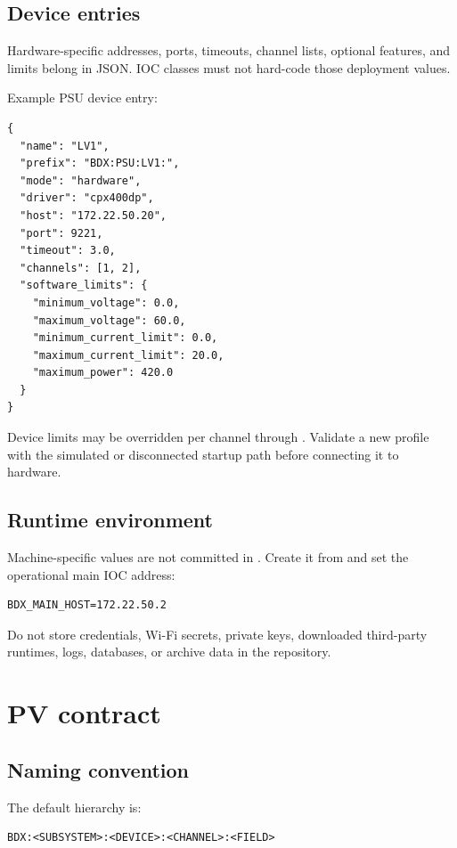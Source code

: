 \subsection{Device entries}

Hardware-specific addresses, ports, timeouts, channel lists, optional features, and limits belong in JSON. IOC classes must not hard-code those deployment values.

Example PSU device entry:

\begin{lstlisting}[style=json]
{
  "name": "LV1",
  "prefix": "BDX:PSU:LV1:",
  "mode": "hardware",
  "driver": "cpx400dp",
  "host": "172.22.50.20",
  "port": 9221,
  "timeout": 3.0,
  "channels": [1, 2],
  "software_limits": {
    "minimum_voltage": 0.0,
    "maximum_voltage": 60.0,
    "minimum_current_limit": 0.0,
    "maximum_current_limit": 20.0,
    "maximum_power": 420.0
  }
}
\end{lstlisting}

Device limits may be overridden per channel through . Validate a new profile with the simulated or disconnected startup path before connecting it to hardware.

\subsection{Runtime environment}

Machine-specific values are not committed in . Create it from  and set the operational main IOC address:

\begin{lstlisting}[style=shell]
BDX_MAIN_HOST=172.22.50.2
\end{lstlisting}

Do not store credentials, Wi-Fi secrets, private keys, downloaded third-party runtimes, logs, databases, or archive data in the repository.

\section{PV contract}

\subsection{Naming convention}

The default hierarchy is:

\begin{lstlisting}
BDX:<SUBSYSTEM>:<DEVICE>:<CHANNEL>:<FIELD>
\end{lstlisting}

